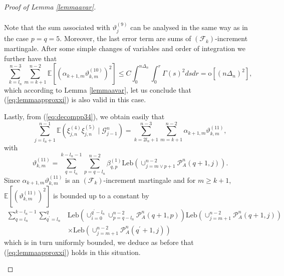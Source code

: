 \documentclass[10pt,a4paper]{amsart}
\newcommand{\Leb}{\ensuremath{\mathrm{Leb}}}
\begin{document}
\begin{proof}[Proof of Lemma \ref{lemmaavar}]
\begin{description}
\begin{align*}
		\end{align*}
		Note that the sum associated with $\vartheta_{j}^{(9)}$ can be analysed
		in the same way as in the case $p=q=5$. Moreover, the last error
		term are sums of $(\mathscr{F}_{k})$-increment martingale. After
		some simple changes of variables and order of integration we further
		have that
		\begin{equation*}
			\sum_{k=l_{n}}^{n-3}\sum_{m=k+1}^{n-2}\mathbb{E}[(\alpha_{k+1,m}\vartheta_{k,m}^{(10)})^{2}]  \leq C\int_{0}^{n\Delta_{n}}\int_{0}^{r}\varGamma(s)^{2}dsdr=\mathrm{o}[(n\Delta_{n})^{2}],
		\end{equation*}
		which according to Lemma \ref{lemmaavar}, let us conclude that (\ref{eq:lemmaapproxxi})
		is also valid in this case.
		\item [{$p=4$}] Lastly, from (\ref{eq:decompp34}), we obtain easily that
		\[
		\sum_{j=l_{n}+1}^{n-1}\mathbb{E}(\xi_{j,n}^{(4)}\xi_{j,n}^{(5)}\mid\mathscr{G}_{j-1}^{n})=\sum_{k=2l_{n}+1}^{n-3}\sum_{m=k+1}^{n-2}\alpha_{k+1,m}\vartheta_{k,m}^{(11)},
		\]
		with 
		\[
		\vartheta_{k,m}^{(11)}=\sum_{q=l_{n}}^{k-l_{n}-1}\sum_{p=q-l_{n}}^{n-2}\beta_{q,p}^{(1)}\Leb(\cup_{j=m\lor p+1}^{n-2}\mathcal{P}_{A}^{n}(q+1,j)).
		\]
		Since $\alpha_{k+1,m}\vartheta_{k,m}^{(11)}$ is an $(\mathscr{F}_{k})$-increment
		martingale and for $m\geq k+1$, $\mathbb{E}[(\vartheta_{k,m}^{(11)})^{2}]$ is bounded up to a constant by
		\begin{align*} \sum_{q=l_{n}}^{k-l_{n}-1}\sum_{q^{\prime}=l_{n}}^{q}&\Leb(\cup_{i=0}^{q^{\prime}-l_{n}}\cup_{p=q-l_{n}}^{n-2}\mathcal{P}_{A}^{n}(q+1,p))\Leb(\cup_{j=m+1}^{n-2}\mathcal{P}_{A}^{n}(q+1,j))\\
			&\times\Leb(\cup_{j=m+1}^{n-2}\mathcal{P}_{A}^{n}(q^{\prime}+1,j))	\end{align*}
		which is in turn uniformly bounded, we deduce as before that (\ref{eq:lemmaapproxxi}) holds in this situation.
	\end{description}
	
\end{proof}
\end{document}
